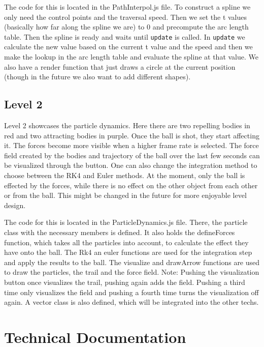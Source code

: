 \documentclass{article}
\begin{document}
The code for this is located in the PathInterpol.js file. To construct a spline we only need the control points and 
the traversal speed. Then we set the t values (basically how far along the spline we are) to $0$ and 
precompute the arc length table. Then the spline is ready and waits until \texttt{update} is called. 
In \texttt{update} we calculate the new value based on the current t value and the speed and then we make the 
lookup in the arc length table and evaluate the spline at that value. We also have a render function 
that just draws a circle at the current position (though in the future we also want to add different shapes).

\subsection{Level 2}
Level 2 showcases the particle dynamics. Here there are two repelling bodies in red and two attracting bodies in purple. Once the ball is shot, they start affecting it. The forces become more visible when a higher frame rate is selected. The force field created by the bodies and trajectory of the ball over the last few seconds can be visualized through the button. One can also change the integration method to choose between the RK4 and Euler methods. At the moment, only the ball is effected by the forces, while there is no effect on the other object from each other or from the ball. This might be changed in the future for more enjoyable level design. \newline

The code for this is located in the ParticleDynamics.js file. There, the particle class with the necessary members is defined. It also holds the defineForces function, which takes all the particles into account, to calculate the effect they have onto the ball. The Rk4 an euler functions are used for the integration step and apply the results to the ball. The visualize and drawArrow functions are used to draw the particles, the trail and the force field. 
Note: Pushing the visualization button once visualizes the trail, pushing again adds the field. Pushing a third time only visualizes the field and pushing a fourth time turns the visualization off again. 
A vector class is also defined, which will be integrated into the other techs. 

\section{Technical Documentation}
\end{document}
